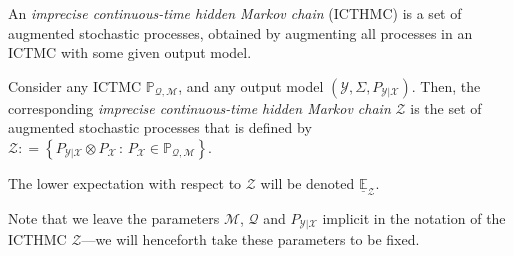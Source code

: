 \documentclass[twoside,11pt]{article}
\newcommand{\reals}{\mathbb{R}}
\newcommand{\states}{\mathcal{X}}
\newcommand{\observs}{\mathcal{Y}}
\newcommand{\lexp}{\underline{\mathbb{E}}_{\rateset,\mathcal{M}}}
\newcommand{\gambles}{\mathcal{L}}
\newcommand{\ind}[1]{\mathbb{I}_{#1}}
\newcommand{\rateset}{\mathcal{Q}}
\newcommand{\coloneqq}{:\!=}
\begin{document}
An \emph{imprecise continuous-time hidden Markov chain} (ICTHMC) is a set of augmented stochastic processes, obtained by augmenting all processes in an ICTMC with some given output model.
\begin{definition}[ICTHMC]\label{def:hidden_ictmc}
Consider any ICTMC $\mathbb{P}_{\rateset,\mathcal{M}}$, and any output model $(\observs,\Sigma,P_{\observs\vert\states})$. Then, the corresponding \emph{imprecise continuous-time hidden Markov chain} $\mathcal{Z}$ is the set of augmented stochastic processes that is defined by
$\mathcal{Z} \coloneqq \left\{ P_{\observs\vert\states}\otimes P_{\states} \,:\, P_{\states}\in\mathbb{P}_{\rateset,\mathcal{M}}\right\}$.

The lower expectation with respect to $\mathcal{Z}$ will be denoted $\underline{\mathbb{E}}_\mathcal{Z}$.
\end{definition}
Note that we leave the parameters $\mathcal{M}$, $\rateset$ and $P_{\observs\vert\states}$ implicit in the notation of the ICTHMC $\mathcal{Z}$---we will henceforth take these parameters to be fixed.



\end{document}
